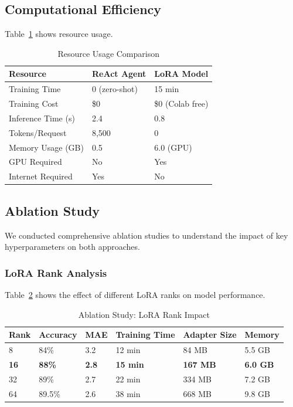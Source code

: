 \documentclass[runningheads]{llncs}
\begin{document}
\subsection{Computational Efficiency}

Table~\ref{tab:resources} shows resource usage.

\begin{table}[H]
\centering
\caption{Resource Usage Comparison}
\label{tab:resources}
\begin{tabular}{@{}p{}p{}p{}@{}}
\toprule
Resource & ReAct Agent & LoRA Model \\
\midrule
Training Time & 0 (zero-shot) & 15 min \\
Training Cost & \$0 & \$0 (Colab free) \\
Inference Time (s) & 2.4 & 0.8 \\
Tokens/Request & 8,500 & 0 \\
Memory Usage (GB) & 0.5 & 6.0 (GPU) \\
GPU Required & No & Yes \\
Internet Required & Yes & No \\
\bottomrule
\end{tabular}
\end{table}

\subsection{Ablation Study}

We conducted comprehensive ablation studies to understand the impact of key hyperparameters on both approaches.

\subsubsection{LoRA Rank Analysis}

Table~\ref{tab:ablation-lora} shows the effect of different LoRA ranks on model performance.

\begin{table}[H]
\centering
\caption{Ablation Study: LoRA Rank Impact}
\label{tab:ablation-lora}
\begin{tabular}{@{}p{}p{}p{}p{}p{}p{}@{}}
\toprule
Rank & Accuracy & MAE & Training Time & Adapter Size & Memory \\
\midrule
8 & 84\% & 3.2 & 12 min & 84 MB & 5.5 GB \\
\textbf{16} & \textbf{88\%} & \textbf{2.8} & \textbf{15 min} & \textbf{167 MB} & \textbf{6.0 GB} \\
32 & 89\% & 2.7 & 22 min & 334 MB & 7.2 GB \\
64 & 89.5\% & 2.6 & 38 min & 668 MB & 9.8 GB \\
\bottomrule
\end{tabular}
\end{table}
\end{document}
